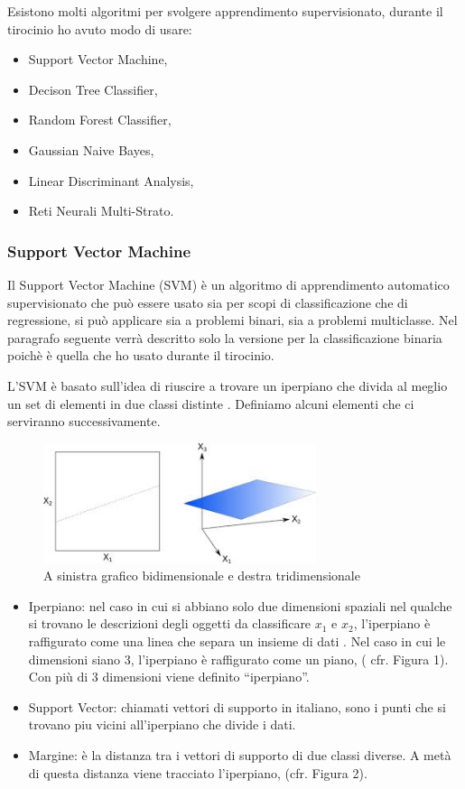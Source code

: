 \documentclass[12pt,italian]{report}
\begin{document}
Esistono molti algoritmi per svolgere apprendimento supervisionato, durante il tirocinio ho avuto modo di usare:
\begin{itemize}
	\item Support Vector Machine,
	\item Decison Tree Classifier,
	\item Random Forest Classifier,
	\item Gaussian Naive Bayes,
	\item Linear Discriminant Analysis,
	\item Reti Neurali Multi-Strato.
\end{itemize}

\subsubsection{Support Vector Machine}
\label{sec:SVC}
Il Support Vector Machine (SVM) è un algoritmo di apprendimento automatico supervisionato che può essere usato sia per scopi di classificazione che di regressione, si può applicare sia a problemi binari, sia a problemi multiclasse. Nel paragrafo seguente verrà descritto solo la versione per la classificazione binaria poichè è quella che ho usato durante il tirocinio.

L'SVM è basato sull'idea di riuscire a trovare un iperpiano che divida al meglio un set di elementi in due classi distinte \cite{LectureNotesNg}. Definiamo alcuni elementi che ci serviranno successivamente.

\begin{figure}[h]
	\centering
	\includegraphics[width = 80mm]{immagini/2e3dimensionisvc}
	\caption{A sinistra grafico bidimensionale e destra tridimensionale}
\end{figure}

\begin{itemize}
	\item Iperpiano: nel caso in cui si abbiano solo due dimensioni spaziali nel qualche si trovano le descrizioni degli oggetti da classificare $x_1$ e $x_2$, l'iperpiano è raffigurato come una linea che separa un insieme di dati \cite{LectureNotesNg}. Nel caso in cui le dimensioni siano 3, l'iperpiano è raffigurato come un piano, ( cfr. Figura 1).
	Con più di 3 dimensioni viene definito ``iperpiano''.
	\item Support Vector: chiamati vettori di supporto in italiano, sono i punti che si trovano piu vicini all'iperpiano che divide i dati.
	\item Margine: è la distanza tra i vettori di supporto di due classi diverse. A metà di questa distanza viene tracciato l'iperpiano, (cfr. Figura 2).
\end{itemize}
\end{document}
